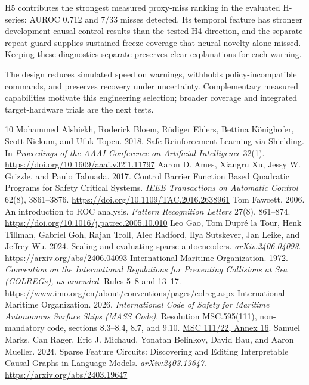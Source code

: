 \documentclass[sigconf,nonacm]{acmart}
\begin{document}
H5 contributes the strongest measured proxy-miss ranking in the evaluated H-series: AUROC 0.712 and 7/33 misses detected. Its temporal feature has stronger development causal-control results than the tested H4 direction, and the separate repeat guard supplies sustained-freeze coverage that neural novelty alone missed. Keeping these diagnostics separate preserves clear explanations for each warning.

The design reduces simulated speed on warnings, withholds policy-incompatible commands, and preserves recovery under uncertainty. Complementary measured capabilities motivate this engineering selection; broader coverage and integrated target-hardware trials are the next tests.


\begin{thebibliography}{10}
\footnotesize
{} Mohammed Alshiekh, Roderick Bloem, R\"udiger Ehlers, Bettina K\"onighofer, Scott Niekum, and Ufuk Topcu. 2018. Safe Reinforcement Learning via Shielding. In \emph{Proceedings of the AAAI Conference on Artificial Intelligence} 32(1). \url{https://doi.org/10.1609/aaai.v32i1.11797}
 Aaron D. Ames, Xiangru Xu, Jessy W. Grizzle, and Paulo Tabuada. 2017. Control Barrier Function Based Quadratic Programs for Safety Critical Systems. \emph{IEEE Transactions on Automatic Control} 62(8), 3861--3876. \url{https://doi.org/10.1109/TAC.2016.2638961}
 Tom Fawcett. 2006. An introduction to ROC analysis. \emph{Pattern Recognition Letters} 27(8), 861--874. \url{https://doi.org/10.1016/j.patrec.2005.10.010}
 Leo Gao, Tom Dupr\'e la Tour, Henk Tillman, Gabriel Goh, Rajan Troll, Alec Radford, Ilya Sutskever, Jan Leike, and Jeffrey Wu. 2024. Scaling and evaluating sparse autoencoders. \emph{arXiv:2406.04093}. \url{https://arxiv.org/abs/2406.04093}
 International Maritime Organization. 1972. \emph{Convention on the International Regulations for Preventing Collisions at Sea (COLREGs), as amended}. Rules 5--8 and 13--17. \url{https://www.imo.org/en/about/conventions/pages/colreg.aspx}
 International Maritime Organization. 2026. \emph{International Code of Safety for Maritime Autonomous Surface Ships (MASS Code)}. Resolution MSC.595(111), non-mandatory code, sections 8.3--8.4, 8.7, and 9.10. \href{https://wwwcdn.imo.org/localresources/en/MediaCentre/Documents/MSC\%20111-22-Annex\%2016\%20(Secretariat).pdf}{MSC 111/22, Annex 16}.
 Samuel Marks, Can Rager, Eric J. Michaud, Yonatan Belinkov, David Bau, and Aaron Mueller. 2024. Sparse Feature Circuits: Discovering and Editing Interpretable Causal Graphs in Language Models. \emph{arXiv:2403.19647}. \url{https://arxiv.org/abs/2403.19647}

\end{thebibliography}
\end{document}
